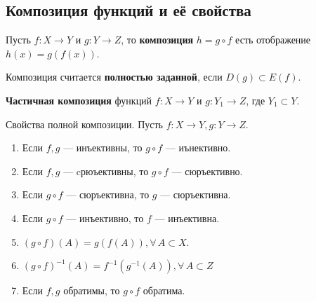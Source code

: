 \documentclass{article}
\begin{document}
\subsection{Композиция функций и её свойства}

\begin{definition}
    \label{def:composition}
    Пусть \(f: X \rightarrow Y\) и \(g: Y \rightarrow Z\), то \textbf{композиция} \(h = g \circ f\) есть отображение \(h(x) = g(f(x))\).
    
    Композиция считается \textbf{полностью заданной}, если \(D(g) \subset E(f)\). 
    
    \textbf{Частичная композиция} функций \(f: X \rightarrow Y\) и \(g: Y_1 \rightarrow Z\), где \(Y_1 \subset Y\).
\end{definition}

\begin{proposition}
    \label{prop:comp-properties}
    Свойства полной композиции. Пусть \(f: X \rightarrow Y, g: Y \rightarrow Z\).
    \begin{enumerate}
        \item Если \(f, g\) --- инъективны, то \(g \circ f\) --- иънективно.
        \item Если \(f, g\) --- cрюъективны, то \(g \circ f\) --- сюръективно.
        \item Если \(g \circ f\) --- сюръективна, то \(g\) --- сюръективна.
        \item Если \(g \circ f\) --- инъективно, то \(f\) --- инъективна.
        \item \((g \circ f) (A) = g(f(A)), \forall\, A \subset X\).
        \item \((g \circ f)^{-1}(A) = f^{-1}(g^{-1}(A)), \forall\, A \subset Z\)
        \item Если \(f, g\) обратимы, то \(g \circ f\) обратима. 
    \end{enumerate}
\end{proposition}
\end{document}
